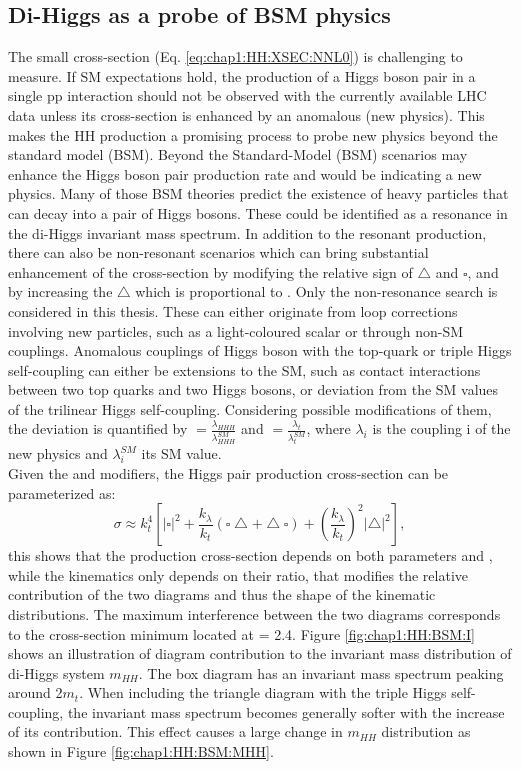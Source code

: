 \subsection{Di-Higgs as a probe of BSM physics}
\label{chap1:HH:BSM}
The small cross-section (Eq. \ref{eq:chap1:HH:XSEC:NNL0}) is challenging to measure. If SM expectations hold, the production of a Higgs boson pair in a single pp interaction should not be observed with the currently available LHC data unless its cross-section is enhanced by an anomalous (new physics). This makes the HH production a promising process to probe new physics beyond the standard model (BSM). Beyond the Standard-Model (BSM) scenarios may enhance the Higgs boson pair production rate and would be indicating a new physics. Many of those BSM theories predict the existence of heavy particles that can decay into a pair of Higgs bosons. These could be identified as a resonance in the di-Higgs invariant mass spectrum. In addition to the resonant production, there can also be non-resonant scenarios which can bring substantial enhancement of the cross-section by modifying the relative sign of $\bigtriangleup$ and $\square$, and by increasing the $\bigtriangleup$ which is proportional to \kl. Only the non-resonance search is considered in this thesis. These can either originate from loop corrections involving new particles, such as a light-coloured scalar or through non-SM couplings. Anomalous couplings of Higgs boson with the top-quark or triple Higgs self-coupling can either be extensions to the SM, such as contact interactions between two top quarks and two Higgs bosons, or deviation from the SM values of the trilinear Higgs self-coupling. Considering possible modifications of them, the deviation is quantified by \kl $ = \frac{\lambda_{HHH}}{\lambda_{HHH}^{SM}}$ and \kt $= \frac{\lambda_{t}}{\lambda_{t}^{SM}}$, where $\lambda_{i}$ is the coupling i of the new physics and $\lambda_{i}^{SM}$ its SM value. \\
Given the \kt and \kl modifiers, the Higgs pair production cross-section can be parameterized as:
\begin{equation}
  \sigma \approx k_{t}^{4}\left[|\square|^{2}+\frac{k_{\lambda}}{k_{t}}(\square\bigtriangleup+\bigtriangleup \square)+\left(\frac{k_{\lambda}}{k_{t}}\right)^{2}|\bigtriangleup|^{2}\right], 
  \label{eq:chap1:HH:XSEC:Param}
\end{equation}
this shows that the production cross-section depends on both parameters \kt and \kl, while the kinematics only depends on their ratio, that modifies the relative contribution of the two diagrams and thus the shape of the kinematic distributions. The maximum interference between the two diagrams corresponds to the cross-section minimum located at \kl = 2.4\kt. Figure \ref{fig:chap1:HH:BSM:I} shows an illustration of diagram contribution to the invariant mass distribution of di-Higgs system $m_{HH}$. The box diagram has an invariant mass spectrum peaking around 2$m_t$. When including the triangle diagram with the triple Higgs self-coupling, the invariant mass spectrum becomes generally softer with the increase of its contribution. This effect causes a large change in $m_{HH}$ distribution as shown in Figure \ref{fig:chap1:HH:BSM:MHH}.
